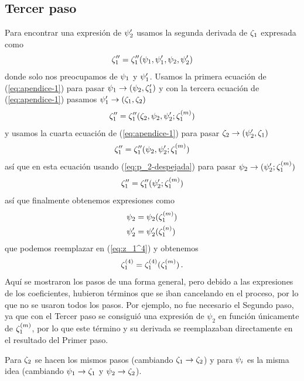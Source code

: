 \documentclass[%
 aip,
 jmp,%
 amsmath,amssymb,
 reprint,%
]{revtex4-2}
\begin{document}
{\subsection{Tercer paso}
Para encontrar una expresión de $\psi_2'$ usamos la segunda derivada de $\zeta_1$ expresada como
\begin{equation}
    \zeta_1''=\zeta_1''(\psi_1,\psi_1',\psi_2,\psi_2')
\end{equation}
donde solo nos preocupamos de $\psi_1$ y $\psi_1'$. Usamos la primera ecuación de (\ref{eq:apendice-1}) para pasar $\psi_1\rightarrow (\psi_2,\zeta_1')$ y con la tercera ecuación de (\ref{eq:apendice-1}) pasamos $\psi_1'\rightarrow (\zeta_1,\zeta_2)$
\begin{equation}
    \zeta_1''=\zeta_1''(\zeta_2,\psi_2,\psi_2';\zeta_1^{(m)})
\end{equation}
y usamos la cuarta ecuación de (\ref{eq:apendice-1}) para pasar $\zeta_2\rightarrow (\psi_2',\zeta_1)$
\begin{equation}
    \zeta_1''=\zeta_1''(\psi_2,\psi_2';\zeta_1^{(m)})
\end{equation}
así que en esta ecuación usando (\ref{eq:p_2-despejada}) para pasar $\psi_2\rightarrow (\psi_2';\zeta_1^{(m)})$
\begin{equation}
    \zeta_1''=\zeta_1''(\psi_2';\zeta_1^{(m)})
\end{equation}
así que finalmente obtenemos expresiones como
\begin{equation}
    \begin{aligned}
        \psi_2&=\psi_2(\zeta_1^{(m)})\\
        \psi_2'&=\psi_2'(\zeta_1^{(n)})
    \end{aligned}
\end{equation}
que podemos reemplazar en (\ref{eq:z_1^4}) y obtenemos
\begin{equation}
    \zeta_1^{(4)}=\zeta_1^{(4)}(\zeta_1^{(m)})\,.
\end{equation}
Aquí se mostraron los pasos de una forma general, pero debido a las expresiones de los coeficientes, hubieron términos que se iban cancelando en el proceso, por lo que no se usaron todos los pasos. Por ejemplo, no fue necesario el Segundo paso, ya que con el Tercer paso se consiguió una expresión de $\psi_2$ en función únicamente de $\zeta_1^{(m)}$, por lo que este término y su derivada se reemplazaban directamente en el resultado del Primer paso.

Para $\zeta_2$ se hacen los mismos pasos (cambiando $\zeta_1\rightarrow \zeta_2$) y para $\psi_i$ es la misma idea (cambiando $\psi_1\rightarrow\zeta_1$ y $\psi_2\rightarrow \zeta_2$).

}
\end{document}
